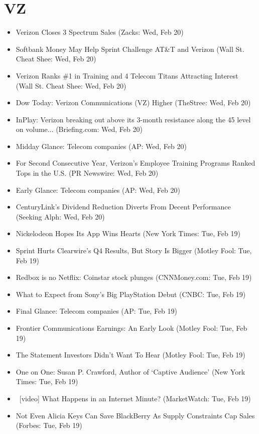\documentclass[11pt,asymmetric]{article}
\begin{document}
\section*{VZ}
\begin{itemize}
\item Verizon Closes 3 Spectrum Sales (Zacks: Wed, Feb 20)
\item Softbank Money May Help Sprint Challenge AT\&T and Verizon (Wall St. Cheat Shee: Wed, Feb 20)
\item Verizon Ranks \#1 in Training and 4 Telecom Titans Attracting Interest (Wall St. Cheat Shee: Wed, Feb 20)
\item Dow Today: Verizon Communications (VZ) Higher (TheStree: Wed, Feb 20)
\item InPlay: Verizon breaking out above its 3-month resistance along the 45 level on volume... (Briefing.com: Wed, Feb 20)
\item Midday Glance: Telecom companies (AP: Wed, Feb 20)
\item For Second Consecutive Year, Verizon's Employee Training Programs Ranked Tops in the U.S. (PR Newswire: Wed, Feb 20)
\item Early Glance: Telecom companies (AP: Wed, Feb 20)
\item CenturyLink's Dividend Reduction Diverts From Decent Performance (Seeking Alph: Wed, Feb 20)
\item Nickelodeon Hopes Its App Wins Hearts (New York Times: Tue, Feb 19)
\item Sprint Hurts Clearwire's Q4 Results, But Story Is Bigger (Motley Fool: Tue, Feb 19)
\item Redbox is no Netflix: Coinstar stock plunges (CNNMoney.com: Tue, Feb 19)
\item What to Expect from Sony's Big PlayStation Debut (CNBC: Tue, Feb 19)
\item Final Glance: Telecom companies (AP: Tue, Feb 19)
\item Frontier Communications Earnings: An Early Look (Motley Fool: Tue, Feb 19)
\item The Statement Investors Didn't Want To Hear (Motley Fool: Tue, Feb 19)
\item One on One: Susan P. Crawford, Author of `Captive Audience' (New York Times: Tue, Feb 19)
\item\ [video] What Happens in an Internet Minute? (MarketWatch: Tue, Feb 19)
\item Not Even Alicia Keys Can Save BlackBerry As Supply Constraints Cap Sales (Forbes: Tue, Feb 19)

\end{itemize}
\end{document}
